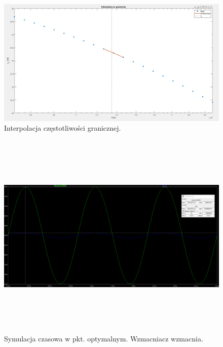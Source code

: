 \documentclass{article}
\begin{document}
\pagebreak
\begin{landscape}
    \begin{figure}[h]
        \vspace*{-2cm}
        \includegraphics[width=20cm,height=10 cm]{graphics/fg_interp.png}
        \centering
        \caption{Interpolacja częstotliwości granicznej.}
    \end{figure}
\end{landscape}

\pagebreak
\begin{landscape}
    \begin{figure}[h]
        \vspace*{-2cm}
        \includegraphics[width=20cm,height=10cm]{graphics/optim_tran.png}
        \centering
        \caption{Symulacja czasowa w pkt. optymalnym. Wzmacniacz wzmacnia.}
    \end{figure}
\end{landscape}
\end{document}
